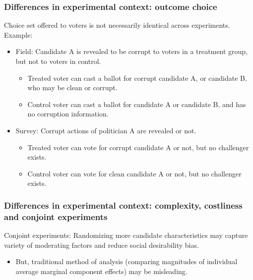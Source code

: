 \documentclass[usenames,dvipsnames]{beamer}
\begin{document}
\begin{frame}
\frametitle{Differences in experimental context: outcome choice}
Choice set offered to voters is not necessarily identical across experiments. Example:

\begin{itemize}
\item Field: Candidate A is revealed to be corrupt to voters in a treatment group, but not to voters in control.
\begin{itemize}
\item Treated voter can cast a ballot for corrupt candidate A, or candidate B, who may be clean or corrupt. 
\item Control voter can cast a ballot for candidate A or candidate B, and has no corruption information.
\end{itemize}

\item Survey: Corrupt actions of politician A are revealed or not. 
\begin{itemize}
\item Treated voter can vote for  corrupt candidate A or not, but no challenger exists. 
\item Control voter can vote for clean candidate A or not, but no challenger exists.
\end{itemize}

\end{itemize}

\end{frame}

\begin{frame}
\frametitle{Differences in experimental context: complexity, costliness and conjoint experiments}
\textcolor{Cerulean}{Conjoint experiments}: Randomizing more candidate characteristics may capture variety of moderating factors and reduce social desirability bias.
\begin{itemize}
\pause
\item But, traditional method of analysis (comparing magnitudes of individual average marginal component effects) may be misleading. 
\end{itemize}

\end{frame}
\end{document}
